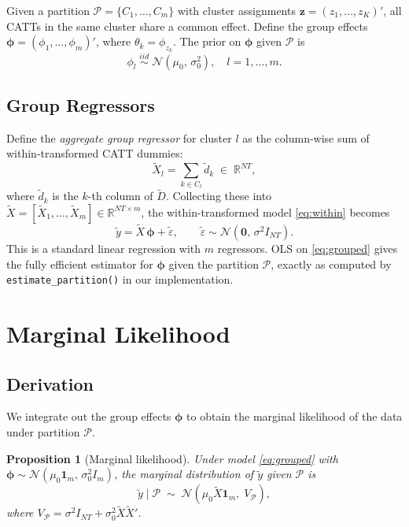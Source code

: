 \documentclass[12pt]{article}
\newtheorem{proposition}{Proposition}
\newcommand{\Normal}{\mathcal{N}}
\newcommand{\R}{\mathbb{R}}
\newcommand{\1}{\mathbbm{1}}
\newcommand{\ytd}{\tilde{y}}
\newcommand{\Dtd}{\tilde{D}}
\newcommand{\dtd}{\tilde{d}}
\newcommand{\epstd}{\tilde{\varepsilon}}
\newcommand{\Xtd}{\tilde{X}}
\begin{document}
Given a partition $\mathcal{P} = \{C_1,\ldots,C_m\}$ with cluster assignments
$\bm{z} = (z_1,\ldots,z_K)'$, all CATTs in the same cluster share a common
effect. Define the group effects $\bm{\phi} = (\phi_1,\ldots,\phi_m)'$, where
$\theta_k = \phi_{z_k}$. The prior on $\bm{\phi}$ given $\mathcal{P}$ is
\begin{equation}
  \phi_l \;\overset{iid}{\sim}\; \Normal(\mu_0,\,\sigma_0^2), \quad l=1,\ldots,m.
\end{equation}

\subsection{Group Regressors}

Define the \emph{aggregate group regressor} for cluster $l$ as the
column-wise sum of within-transformed CATT dummies:
\begin{equation}
  \Xtd_l = \sum_{k\in C_l} \dtd_k \;\in\; \R^{NT},
\end{equation}
where $\dtd_k$ is the $k$-th column of $\Dtd$. Collecting these into
$\Xtd = [\Xtd_1,\ldots,\Xtd_m]\in\R^{NT\times m}$, the within-transformed
model \eqref{eq:within} becomes
\begin{equation}
  \ytd = \Xtd\,\bm{\phi} + \epstd, \qquad \epstd\sim\Normal(\bm{0},\,\sigma^2 I_{NT}).
  \label{eq:grouped}
\end{equation}
This is a standard linear regression with $m$ regressors. OLS on \eqref{eq:grouped}
gives the fully efficient estimator for $\bm{\phi}$ given the partition
$\mathcal{P}$, exactly as computed by \texttt{estimate\_partition()} in our
implementation.

\section{Marginal Likelihood}

\subsection{Derivation}

We integrate out the group effects $\bm{\phi}$ to obtain the marginal
likelihood of the data under partition $\mathcal{P}$.

\begin{proposition}[Marginal likelihood]
  Under model \eqref{eq:grouped} with $\bm{\phi}\sim\Normal(\mu_0\mathbf{1}_m,\,\sigma_0^2 I_m)$,
  the marginal distribution of $\ytd$ given $\mathcal{P}$ is
  \begin{equation}
    \ytd \mid \mathcal{P} \;\sim\; \Normal\!\left(\mu_0\Xtd\mathbf{1}_m,\; V_{\mathcal{P}}\right),
    \label{eq:marginal}
  \end{equation}
  where $V_{\mathcal{P}} = \sigma^2 I_{NT} + \sigma_0^2\Xtd\Xtd'$.
\end{proposition}
\end{document}
